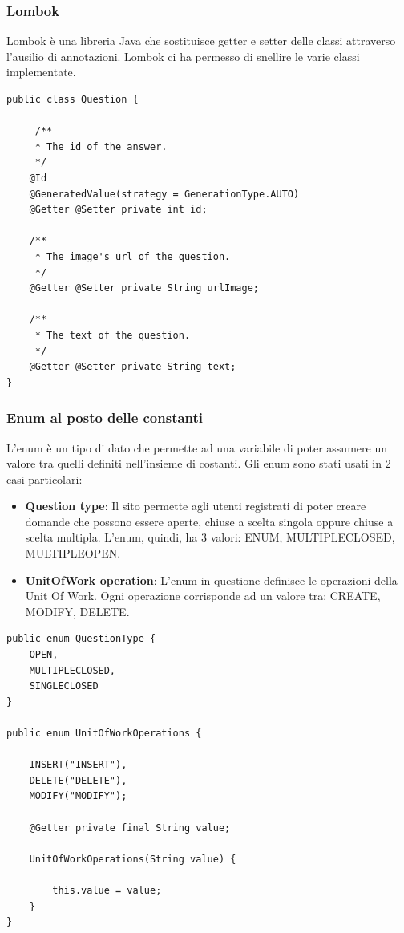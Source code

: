 \documentclass[12pt]{article}
\begin{document}
\subsubsection{Lombok}
Lombok è una libreria Java che sostituisce getter e setter delle classi attraverso l'ausilio di annotazioni. Lombok ci ha permesso di snellire le varie classi implementate.
 \begin{lstlisting}
public class Question {
	
	 /**
     * The id of the answer.
     */
    @Id
    @GeneratedValue(strategy = GenerationType.AUTO)
	@Getter	@Setter private int id;
	
    /**
     * The image's url of the question.
     */
	@Getter	@Setter private String urlImage;
	
	/**
     * The text of the question.
     */
	@Getter	@Setter private String text;
}
\end{lstlisting}

\subsubsection{Enum al posto delle constanti}
L'enum è un tipo di dato che permette ad una variabile di poter assumere un valore tra quelli definiti nell'insieme di costanti. Gli enum sono stati usati in 2 casi particolari:
\begin{itemize}
    \item \textbf{Question type}: Il sito permette agli utenti registrati di poter creare domande che possono essere aperte, chiuse a scelta singola oppure chiuse a scelta multipla. L'enum, quindi, ha 3 valori: ENUM, MULTIPLECLOSED, MULTIPLEOPEN.
    \item \textbf{UnitOfWork operation}: L'enum in questione definisce le operazioni della Unit Of Work. Ogni operazione corrisponde ad un valore tra: CREATE, MODIFY, DELETE.
\end{itemize}
 \begin{lstlisting}
public enum QuestionType {
    OPEN,
    MULTIPLECLOSED,
    SINGLECLOSED
}

public enum UnitOfWorkOperations {

	INSERT("INSERT"),
	DELETE("DELETE"),
	MODIFY("MODIFY");

	@Getter	private final String value;

	UnitOfWorkOperations(String value) {

		this.value = value;
	}
}
\end{lstlisting}
\end{document}
